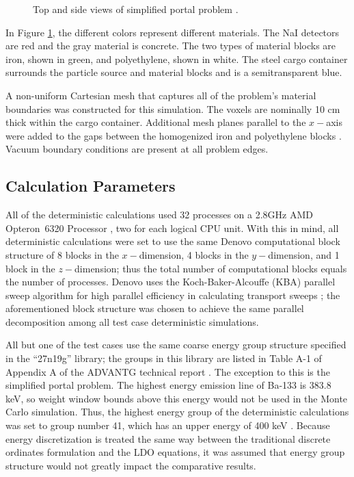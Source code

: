 \documentclass{article} %
\begin{document}
\begin{figure}[!htb]
\begin{subfigure}{0.475\textwidth}
\end{subfigure}
\caption{Top and side views of simplified portal problem \cite{advantg}.}
\label{p1}
\end{figure}

In Figure \ref{p1}, the different colors represent different materials. The NaI
detectors are red and the gray material is concrete. The two types of material
blocks are iron, shown in green, and polyethylene, shown in white. The steel
cargo container surrounds the particle source and material blocks and is a
semitransparent blue.

A non-uniform Cartesian mesh that captures all of the problem's material
boundaries was constructed for this simulation. The voxels are nominally 10 cm
thick within the cargo container. Additional mesh planes parallel to the
$x-$axis were added to the gaps between the homogenized iron and polyethylene
blocks \cite{advantg}. Vacuum boundary conditions are present at all problem
edges.

\subsection{Calculation Parameters}
\label{params}

All of the deterministic calculations used 32 processes on a 2.8GHz AMD 
Opteron\texttrademark\ 6320 Processor \cite{amd}, two for each logical CPU
unit. With this in mind, all deterministic calculations were set to use the
same Denovo computational block structure of 8 blocks in the $x-$dimension, 4
blocks in the $y-$dimension, and 1 block in the $z-$dimension;
thus the total number of computational blocks equals the number of processes.
Denovo uses the Koch-Baker-Alcouffe (KBA) parallel sweep algorithm for high
parallel efficiency in calculating transport sweeps \cite{denovo}; the
aforementioned block structure was chosen to achieve the same parallel
decomposition among all test case deterministic simulations. 

All but one of the test cases use the same coarse energy group structure
specified in the ``27n19g'' library; the groups in this library are listed in
Table A-1 of Appendix A of the ADVANTG technical report \cite{advantg}. The
exception to this is the simplified portal problem. The highest energy
emission line of Ba-133 is 383.8 keV, so weight window bounds above this
energy would not be used in the Monte Carlo simulation. Thus, the highest
energy group of the deterministic calculations was set to group number 41,
which has an upper energy of 400 keV \cite{advantg}. Because 
energy discretization is treated the same way between the traditional discrete 
ordinates formulation and the LDO equations, it was assumed that energy group 
structure would not greatly impact the comparative results.
\end{document}
